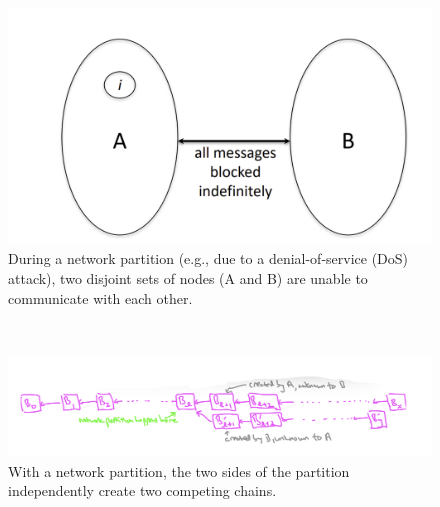 \begin{figure}[h]
    \centering
    \includegraphics[scale = 0.5]{figures/f32.png}
    \caption{During a network partition (e.g., due to a denial-of-service (DoS) attack), two
disjoint sets of nodes (A and B) are unable to communicate with each other.}
    \label{fig:mesh1}
\end{figure}\\
\begin{figure}[h]
    \centering
    \includegraphics[scale = 0.5]{figures/f33.png}
    \caption{ With a network partition, the two sides of the partition independently create two
competing chains.}
    \label{fig:mesh1}
\end{figure}\\


